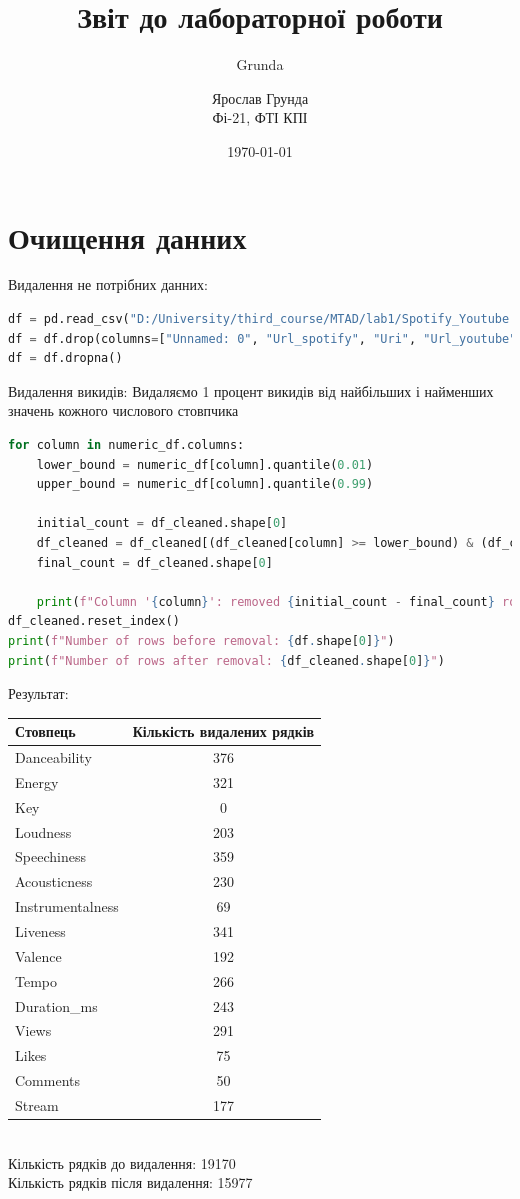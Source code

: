 \documentclass{article}
\author{Grunda}
\title{Звіт до лабораторної роботи}
\author{Ярослав Грунда \\ Фі-21, ФТІ КПІ}
\date{\today}
\begin{document}
\maketitle 

\tableofcontents  
\newpage

\section{Очищення данних}
Видалення не потрібних данних:
\begin{lstlisting}[language=Python]
df = pd.read_csv("D:/University/third_course/MTAD/lab1/Spotify_Youtube.csv")
df = df.drop(columns=["Unnamed: 0", "Url_spotify", "Uri", "Url_youtube"])
df = df.dropna()
\end{lstlisting}

Видалення викидів:
Видаляємо 1 процент викидів від найбільших і найменших значень кожного числового стовпчика
\begin{lstlisting}[language=Python]
for column in numeric_df.columns:
    lower_bound = numeric_df[column].quantile(0.01)  
    upper_bound = numeric_df[column].quantile(0.99)  
    
    initial_count = df_cleaned.shape[0]
    df_cleaned = df_cleaned[(df_cleaned[column] >= lower_bound) & (df_cleaned[column] <= upper_bound)]
    final_count = df_cleaned.shape[0]
    
    print(f"Column '{column}': removed {initial_count - final_count} rows.")
df_cleaned.reset_index()
print(f"Number of rows before removal: {df.shape[0]}")
print(f"Number of rows after removal: {df_cleaned.shape[0]}")
\end{lstlisting}
Результат:\\
\begin{tabular}{|l|c|}
    \hline
    \textbf{Стовпець} & \textbf{Кількість видалених рядків} \\
    \hline
    Danceability & 376 \\
    Energy & 321 \\
    Key & 0 \\
    Loudness & 203 \\
    Speechiness & 359 \\
    Acousticness & 230 \\
    Instrumentalness & 69 \\
    Liveness & 341 \\
    Valence & 192 \\
    Tempo & 266 \\
    Duration\_ms & 243 \\
    Views & 291 \\
    Likes & 75 \\
    Comments & 50 \\
    Stream & 177 \\
    \hline
    \end{tabular}
    \\
    Кількість рядків до видалення: 19170 \\
    Кількість рядків після видалення: 15977
\end{document}
